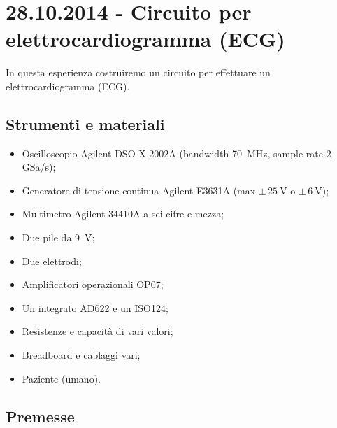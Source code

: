 \section{28.10.2014 - Circuito per elettrocardiogramma (ECG)}

In questa esperienza costruiremo un circuito per effettuare un elettrocardiogramma (ECG).

\subsection*{Strumenti e materiali}

\begin{itemize} [noitemsep]
	\item Oscilloscopio Agilent DSO-X 2002A (bandwidth \SI{70}{\mega\hertz}, sample rate \num{2} GSa/s);
		\item Generatore di tensione continua Agilent E3631A (max $\pm \, \SI{25}{\volt}$ o $\pm \, \SI{6}{\volt}$);
		\item Multimetro Agilent 34410A a sei cifre e mezza;
		\item Due pile da \SI{9}{\volt};
		\item Due elettrodi;
		\item Amplificatori operazionali OP07;
		\item Un integrato AD622 e un ISO124;
		\item Resistenze e capacità di vari valori;
		\item Breadboard e cablaggi vari;
		\item Paziente (umano).
\end{itemize}


\subsection{Premesse}

